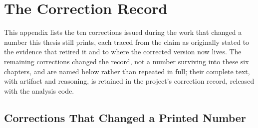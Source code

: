 \chapter{The Correction Record}
\label{app:corrections}

This appendix lists the ten corrections issued during the work that changed a number this
thesis still prints, each traced from the claim as originally stated to the evidence that
retired it and to where the corrected version now lives. The remaining corrections changed
the record, not a number surviving into these six chapters, and are named below rather than
repeated in full; their complete text, with artifact and reasoning, is retained in
the project's correction record, released with the analysis code.

\section{Corrections That Changed a Printed Number}

